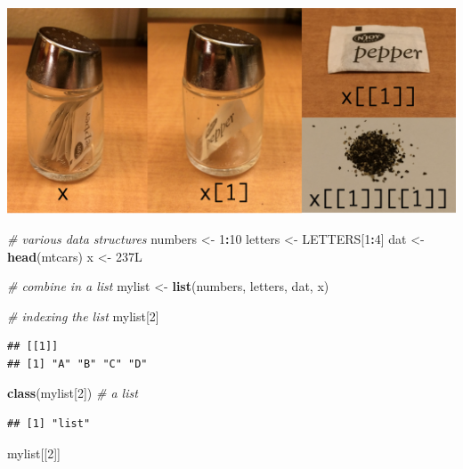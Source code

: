 \documentclass[
]{book}
\newenvironment{Shaded}{\begin{snugshade}}{\end{snugshade}}
\newcommand{\CommentTok}[1]{\textcolor[rgb]{0.56,0.35,0.01}{\textit{#1}}}
\newcommand{\DecValTok}[1]{\textcolor[rgb]{0.00,0.00,0.81}{#1}}
\newcommand{\KeywordTok}[1]{\textcolor[rgb]{0.13,0.29,0.53}{\textbf{#1}}}
\newcommand{\NormalTok}[1]{#1}
\newcommand{\OperatorTok}[1]{\textcolor[rgb]{0.81,0.36,0.00}{\textbf{#1}}}
\newcommand{\StringTok}[1]{\textcolor[rgb]{0.31,0.60,0.02}{#1}}
\begin{document}
\includegraphics{R/RDataWrangling/images/indexing_lists.png}

\begin{Shaded}
\begin{Highlighting}[]
\CommentTok{\# various data structures}
\NormalTok{numbers \textless{}{-}}\StringTok{ }\DecValTok{1}\OperatorTok{:}\DecValTok{10}
\NormalTok{letters \textless{}{-}}\StringTok{ }\NormalTok{LETTERS[}\DecValTok{1}\OperatorTok{:}\DecValTok{4}\NormalTok{]}
\NormalTok{dat \textless{}{-}}\StringTok{ }\KeywordTok{head}\NormalTok{(mtcars)}
\NormalTok{x \textless{}{-}}\StringTok{ }\NormalTok{237L}

\CommentTok{\# combine in a list}
\NormalTok{mylist \textless{}{-}}\StringTok{ }\KeywordTok{list}\NormalTok{(numbers, letters, dat, x)}

\CommentTok{\# indexing the list}
\NormalTok{mylist[}\DecValTok{2}\NormalTok{]}
\end{Highlighting}
\end{Shaded}

\begin{verbatim}
## [[1]]
## [1] "A" "B" "C" "D"
\end{verbatim}

\begin{Shaded}
\begin{Highlighting}[]
\KeywordTok{class}\NormalTok{(mylist[}\DecValTok{2}\NormalTok{]) }\CommentTok{\# a list}
\end{Highlighting}
\end{Shaded}

\begin{verbatim}
## [1] "list"
\end{verbatim}

\begin{Shaded}
\begin{Highlighting}[]
\NormalTok{mylist[[}\DecValTok{2}\NormalTok{]]}
\end{Highlighting}
\end{Shaded}
\end{document}
